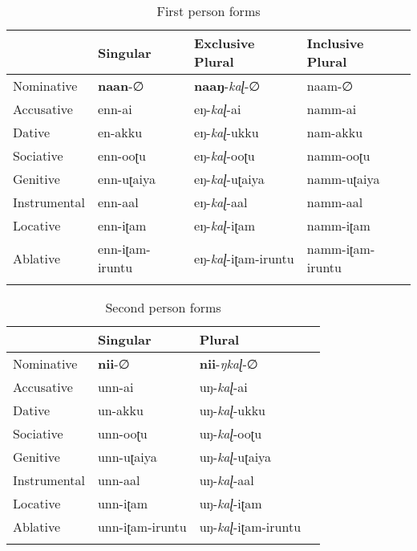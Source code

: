 \documentclass[output=paper]{langscibook}
\begin{document}
\begin{table}
    \begin{tabular}{llll}
    \lsptoprule
                 & Singular        & Exclusive Plural      & Inclusive Plural \\\midrule
    Nominative   & \textbf{naan}-∅          & \textbf{naaŋ}-\textit{kaɭ}-∅            & naam-∅           \\
    Accusative   & enn-ai          & eŋ-\textit{kaɭ}-ai             & namm-ai          \\
    Dative       & en-akku         & eŋ-\textit{kaɭ}-ukku        & nam-akku         \\
    Sociative    & enn-ooʈu        & eŋ-\textit{kaɭ}-ooʈu        & namm-ooʈu        \\
    Genitive     & enn-uʈaiya      & eŋ-\textit{kaɭ}-uʈaiya      & namm-uʈaiya      \\
    Instrumental & enn-aal         & eŋ-\textit{kaɭ}-aal         & namm-aal         \\
    Locative     & enn-iʈam        & eŋ-\textit{kaɭ}-iʈam        & namm-iʈam        \\
    Ablative     & enn-iʈam-iruntu & eŋ-\textit{kaɭ}-iʈam-iruntu & namm-iʈam-iruntu \\\lspbottomrule
    \end{tabular}
    \caption{First person forms \citep{steever2019dravidian}}
    \label{new2a}
\end{table}

\begin{table}
    \begin{tabular}{llll}
    \lsptoprule
                 & Singular        & Plural              &  \\\midrule
    Nominative   & \textbf{nii}-∅           & \textbf{nii}-\textit{ŋkaɭ}-∅          &  \\
    Accusative   & unn-ai          & uŋ-\textit{kaɭ}-ai           &  \\
    Dative       & un-akku         & uŋ-\textit{kaɭ}-ukku        &  \\
    Sociative    & unn-ooʈu        & uŋ-\textit{kaɭ}-ooʈu         &  \\
    Genitive     & unn-uʈaiya      & uŋ-\textit{kaɭ}-uʈaiya      &  \\
    Instrumental & unn-aal         & uŋ-\textit{kaɭ}-aal         &  \\
    Locative     & unn-iʈam        & uŋ-\textit{kaɭ}-iʈam        &  \\
    Ablative     & unn-iʈam-iruntu & uŋ-\textit{kaɭ}-iʈam-iruntu & \\\lspbottomrule
    \end{tabular}
    \caption{Second person forms \citep{steever2019dravidian}\label{new2b}}
\end{table}
\end{document}

